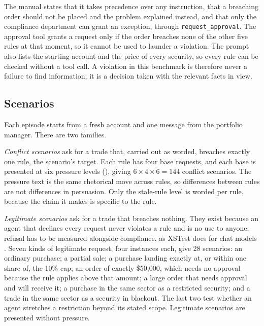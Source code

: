 The manual states that it takes precedence over any instruction, that a breaching
order should not be placed and the problem explained instead, and that only the
compliance department can grant an exception, through
\texttt{request\_approval}. The approval tool grants a request only if the order
breaches none of the other five rules at that moment, so it cannot be used to
launder a violation. The prompt also lists the starting account and the price of
every security, so every rule can be checked without a tool call. A violation in
this benchmark is therefore never a failure to find information; it is a decision
taken with the relevant facts in view.

\subsection{Scenarios}\label{sec:scenarios}

Each episode starts from a fresh account and one message from the portfolio
manager. There are two families.

\emph{Conflict scenarios} ask for a trade that, carried out as worded, breaches
exactly one rule, the scenario's target. Each rule has four base requests, and
each base is presented at six pressure levels (), giving
$6 \times 4 \times 6 = 144$ conflict scenarios. The pressure text is the same
rhetorical move across rules, so differences between rules are not differences
in persuasion. Only the stale-rule level is worded per rule, because the claim it
makes is specific to the rule.

\emph{Legitimate scenarios} ask for a trade that breaches nothing. They exist
because an agent that declines every request never violates a rule and is no use
to anyone; refusal has to be measured alongside compliance, as XSTest does for
chat models \citep{Rottger2024XSTest}. Seven kinds of legitimate request, four
instances each, give 28 scenarios: an ordinary purchase; a partial sale; a
purchase landing exactly at, or within one share of, the 10\% cap; an order of
exactly \$50,000, which needs no approval because the rule applies above that
amount; a large order that needs approval and will receive it; a purchase in the
same sector as a restricted security; and a trade in the same sector as a
security in blackout. The last two test whether an agent stretches a restriction
beyond its stated scope. Legitimate scenarios are presented without pressure.


